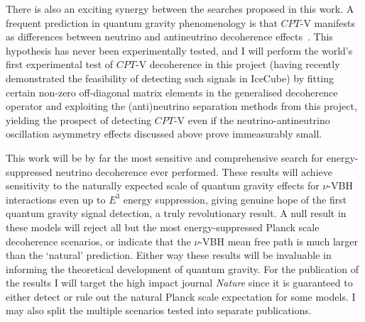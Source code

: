 \documentclass[a4paper,11pt]{article}
\newcounter{bar}
\begin{document}
There is also an exciting synergy between the searches proposed in this work. A frequent prediction in quantum gravity phenomenology is that $CPT$-V manifests as differences between neutrino and antineutrino decoherence effects~\cite{Mavromatos_2009, Barenboim:2004wu, Carrasco:2018sca, Buoninfante:2020iyr, Capolupo:2020myw}. This hypothesis has never been experimentally tested, and I will perform the world's first experimental test of $CPT$-V decoherence in this project (having recently demonstrated the feasibility of detecting such signals in IceCube) by fitting certain non-zero off-diagonal matrix elements in the generalised decoherence operator and exploiting the (anti)neutrino separation methods from this project, yielding the prospect of detecting $CPT$-V even if the neutrino-antineutrino oscillation asymmetry effects discussed above prove immeasurably small.


This work will be by far the most sensitive and comprehensive search for energy-suppressed neutrino decoherence ever performed. These results will achieve sensitivity to the naturally expected scale of quantum gravity effects for $\nu$-VBH interactions even up to $E^3$ energy suppression, giving genuine hope of the first quantum gravity signal detection, a truly revolutionary result. A null result in these models will reject all but the most energy-suppressed Planck scale decoherence scenarios, or indicate that the $\nu$-VBH mean free path is much larger than the `natural' prediction. Either way these results will be invaluable in informing the theoretical development of quantum gravity. For the publication of the results I will target the high impact journal \textit{Nature} since it is guaranteed to either detect or rule out the natural Planck scale expectation for some models. I may also split the multiple scenarios tested into separate publications. \\

\end{document}
